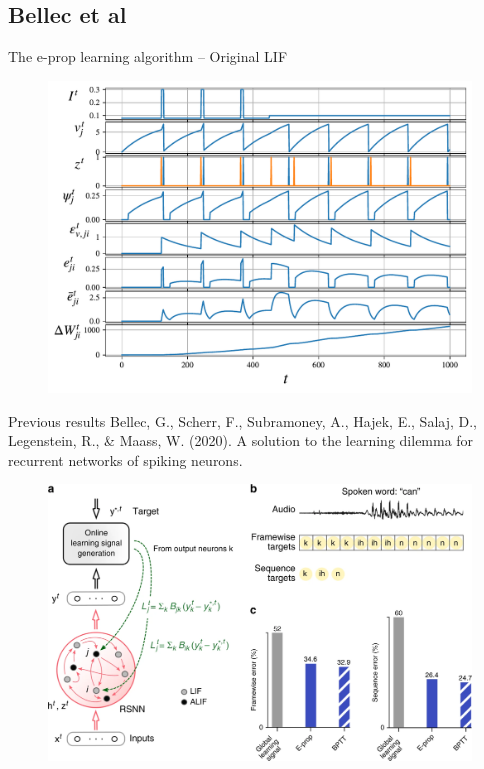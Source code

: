\documentclass[t]{beamer}
\begin{document}
\subsection{Bellec et al}

\begin{frame}{The e-prop learning algorithm -- Original LIF}

	\begin{figure}[!ht]
		\includegraphics[width=0.8\linewidth]{demo_bellec_lif.pdf}
	\end{figure}

\end{frame}

\begin{frame}{Previous results}
\tiny{
Bellec, G., Scherr, F., Subramoney, A., Hajek, E., Salaj, D., Legenstein, R., \& Maass, W. (2020). A solution to the learning dilemma for recurrent networks of spiking neurons.}

\begin{figure}[!ht]
		\includegraphics[width=0.8\linewidth]{timitperformance.png}
	\end{figure}

\end{frame}
\end{document}
